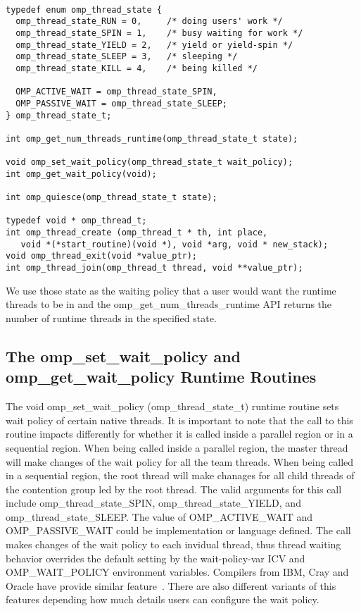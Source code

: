 \lstset{basicstyle=\sffamily\small,language=c, numbersep=1pt}
\begin{lstlisting}[frame=single]  % Start your code-block

typedef enum omp_thread_state {
  omp_thread_state_RUN = 0,     /* doing users' work */
  omp_thread_state_SPIN = 1,    /* busy waiting for work */
  omp_thread_state_YIELD = 2,   /* yield or yield-spin */
  omp_thread_state_SLEEP = 3,   /* sleeping */
  omp_thread_state_KILL = 4,    /* being killed */

  OMP_ACTIVE_WAIT = omp_thread_state_SPIN,
  OMP_PASSIVE_WAIT = omp_thread_state_SLEEP;
} omp_thread_state_t; 

int omp_get_num_threads_runtime(omp_thread_state_t state);

void omp_set_wait_policy(omp_thread_state_t wait_policy);
int omp_get_wait_policy(void);

int omp_quiesce(omp_thread_state_t state);

typedef void * omp_thread_t;
int omp_thread_create (omp_thread_t * th, int place,  
   void *(*start_routine)(void *), void *arg, void * new_stack);
void omp_thread_exit(void *value_ptr);
int omp_thread_join(omp_thread_t thread, void **value_ptr);

\end{lstlisting}

We use those state as the waiting policy that a user would want the runtime threads to be in and the {\sf omp\_get\_num\_threads\_runtime} API returns the number of runtime threads in the specified state.

\subsection{The {\sf omp\_set\_wait\_policy} and {\sf omp\_get\_wait\_policy} Runtime Routines}
The {\sf void omp\_set\_wait\_policy (omp\_thread\_state\_t)} runtime routine sets wait policy of certain 
native threads. It is important to note that the call to this routine impacts differently for 
whether it is called inside a {\sf parallel} region or in a sequential region. 
When being called inside a parallel region, the master thread will make changes of the wait policy for all the team 
threads. When being called in a sequential region, the root thread will make chanages for all child threads of 
the contention group led by the root thread. The valid arguments for this call 
include {\sf omp\_thread\_state\_SPIN}, {\sf omp\_thread\_state\_YIELD}, 
and {\sf omp\_thread\_state\_SLEEP}. The value of  {\sf OMP\_ACTIVE\_WAIT} and 
{\sf OMP\_PASSIVE\_WAIT} could be implementation or language defined. The call makes changes of the wait
policy to each invidual thread, thus thread waiting behavior overrides the default 
setting by the wait-policy-var ICV and OMP\_WAIT\_POLICY environment variables. 
Compilers from IBM, Cray and Oracle have provide similar feature~\cite{ibmwait,craywait,oraclewait}.
There are also different variants of this features depending how much details users can configure
the wait policy.

